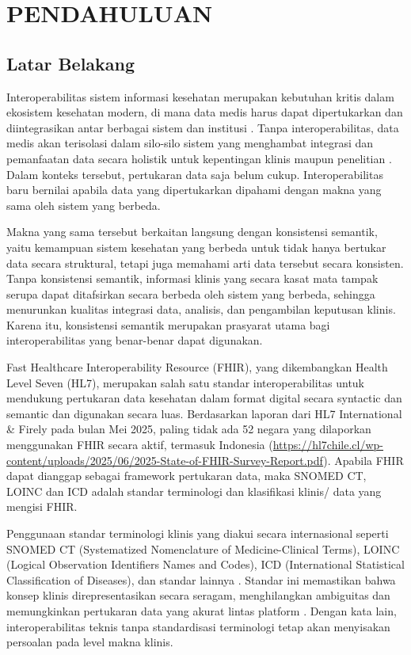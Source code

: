 \chapter{PENDAHULUAN}

\section{Latar Belakang}

Interoperabilitas sistem informasi kesehatan merupakan kebutuhan kritis dalam ekosistem kesehatan modern, di mana data medis harus dapat dipertukarkan dan diintegrasikan antar berbagai sistem dan institusi \citep{ayuningtyas_bringing_2025}. Tanpa interoperabilitas, data medis akan terisolasi dalam silo-silo sistem yang menghambat integrasi dan pemanfaatan data secara holistik untuk kepentingan klinis maupun penelitian \citep{rinaldi_towards_2023}. Dalam konteks tersebut, pertukaran data saja belum cukup. Interoperabilitas baru bernilai apabila data yang dipertukarkan dipahami dengan makna yang sama oleh sistem yang berbeda.

Makna yang sama tersebut berkaitan langsung dengan konsistensi semantik, yaitu kemampuan sistem kesehatan yang berbeda untuk tidak hanya bertukar data secara struktural, tetapi juga memahami arti data tersebut secara konsisten. Tanpa konsistensi semantik, informasi klinis yang secara kasat mata tampak serupa dapat ditafsirkan secara berbeda oleh sistem yang berbeda, sehingga menurunkan kualitas integrasi data, analisis, dan pengambilan keputusan klinis. Karena itu, konsistensi semantik merupakan prasyarat utama bagi interoperabilitas yang benar-benar dapat digunakan.

Fast Healthcare Interoperability Resource (FHIR), yang dikembangkan Health Level Seven (HL7), merupakan salah satu standar interoperabilitas untuk mendukung pertukaran data kesehatan dalam format digital secara syntactic dan semantic dan digunakan secara luas. Berdasarkan laporan dari HL7 International \& Firely pada bulan Mei 2025, paling tidak ada 52 negara yang dilaporkan menggunakan FHIR secara aktif, termasuk Indonesia (\url{https://hl7chile.cl/wp-content/uploads/2025/06/2025-State-of-FHIR-Survey-Report.pdf}). Apabila FHIR dapat dianggap sebagai framework pertukaran data, maka SNOMED CT, LOINC dan ICD adalah standar terminologi dan klasifikasi klinis/ data yang mengisi FHIR.

Penggunaan standar terminologi klinis yang diakui secara internasional seperti SNOMED CT (Systematized Nomenclature of Medicine-Clinical Terms), LOINC (Logical Observation Identifiers Names and Codes), ICD (International Statistical Classification of Diseases), dan standar lainnya \citep{ayuningtyas_bringing_2025,bennett_mimic-iv_2023}. Standar ini memastikan bahwa konsep klinis direpresentasikan secara seragam, menghilangkan ambiguitas dan memungkinkan pertukaran data yang akurat lintas platform \citep{bidgood_snomed_1998}. Dengan kata lain, interoperabilitas teknis tanpa standardisasi terminologi tetap akan menyisakan persoalan pada level makna klinis.

